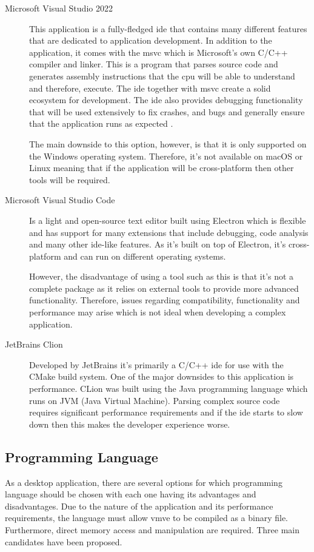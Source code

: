 \documentclass[11pt]{article}
\begin{document}
\begin{description}
  \item[Microsoft Visual Studio 2022] This application is a fully-fledged
    \gls*{ide} that contains many different features that are dedicated to
    application development. In addition to the application, it comes with the
    \gls*{msvc} which is Microsoft's own C/C++ compiler and linker. This is a
    program that parses source code and generates assembly instructions that the
    \gls*{cpu} will be able to understand and therefore, execute. The \gls*{ide}
    together with \gls*{msvc} create a solid ecosystem for development. The
    \gls*{ide} also provides debugging functionality that will be used
    extensively to fix crashes, and bugs and generally ensure that the
    application runs as expected \cite{visualstudio}. 

    The main downside to this option, however, is that it is only supported on
    the Windows operating system. Therefore, it's not available on macOS or
    Linux meaning that if the application will be cross-platform then other
    tools will be required.

  \item[Microsoft Visual Studio Code] Is a light and open-source text editor
    built using Electron which is flexible and has support for many extensions
    that include debugging, code analysis and many other ide-like features. As
    it's built on top of Electron, it's cross-platform and can run on different
    operating systems.

    However, the disadvantage of using a tool such as this is that it's not a
    complete package as it relies on external tools to provide more advanced
    functionality. Therefore, issues regarding compatibility, functionality and
    performance may arise which is not ideal when developing a complex
    application.
  
  \item[JetBrains Clion] Developed by JetBrains it's primarily a C/C++
    \gls*{ide} for use with the CMake build system. One of the major downsides
    to this application is performance. CLion was built using the Java
    programming language which runs on JVM (Java Virtual Machine). Parsing
    complex source code requires significant performance requirements and if the
    \gls*{ide} starts to slow down then this makes the developer experience
    worse.
\end{description}

\subsection{Programming Language} \label{programming_language}
As a desktop application, there are several options for which programming
language should be chosen with each one having its advantages and disadvantages.
Due to the nature of the application and its performance requirements, the
language must allow \gls*{vmve} to be compiled as a binary file. Furthermore,
direct memory access and manipulation are required. Three main candidates have
been proposed.
\end{document}
